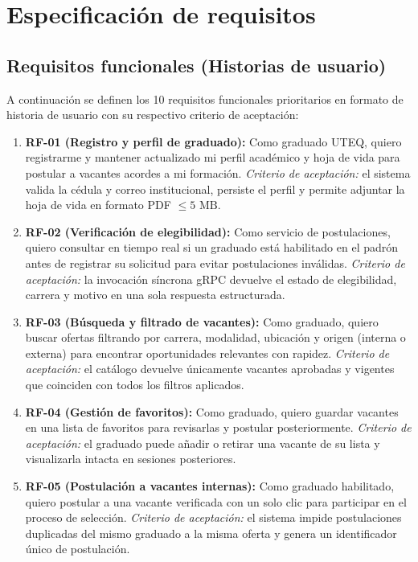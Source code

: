 \documentclass[11pt,a4paper]{article}
\begin{document}
\section{Especificación de requisitos}

\subsection{Requisitos funcionales (Historias de usuario)}

A continuación se definen los 10 requisitos funcionales prioritarios en formato de historia de usuario con su respectivo criterio de aceptación:

\begin{enumerate}
    \item \textbf{RF-01 (Registro y perfil de graduado):} Como graduado UTEQ, quiero registrarme y mantener actualizado mi perfil académico y hoja de vida para postular a vacantes acordes a mi formación. \textit{Criterio de aceptación:} el sistema valida la cédula y correo institucional, persiste el perfil y permite adjuntar la hoja de vida en formato PDF $\le 5\text{ MB}$.
    \item \textbf{RF-02 (Verificación de elegibilidad):} Como servicio de postulaciones, quiero consultar en tiempo real si un graduado está habilitado en el padrón antes de registrar su solicitud para evitar postulaciones inválidas. \textit{Criterio de aceptación:} la invocación síncrona gRPC devuelve el estado de elegibilidad, carrera y motivo en una sola respuesta estructurada.
    \item \textbf{RF-03 (Búsqueda y filtrado de vacantes):} Como graduado, quiero buscar ofertas filtrando por carrera, modalidad, ubicación y origen (interna o externa) para encontrar oportunidades relevantes con rapidez. \textit{Criterio de aceptación:} el catálogo devuelve únicamente vacantes aprobadas y vigentes que coinciden con todos los filtros aplicados.
    \item \textbf{RF-04 (Gestión de favoritos):} Como graduado, quiero guardar vacantes en una lista de favoritos para revisarlas y postular posteriormente. \textit{Criterio de aceptación:} el graduado puede añadir o retirar una vacante de su lista y visualizarla intacta en sesiones posteriores.
    \item \textbf{RF-05 (Postulación a vacantes internas):} Como graduado habilitado, quiero postular a una vacante verificada con un solo clic para participar en el proceso de selección. \textit{Criterio de aceptación:} el sistema impide postulaciones duplicadas del mismo graduado a la misma oferta y genera un identificador único de postulación.

\end{enumerate}
\end{document}
